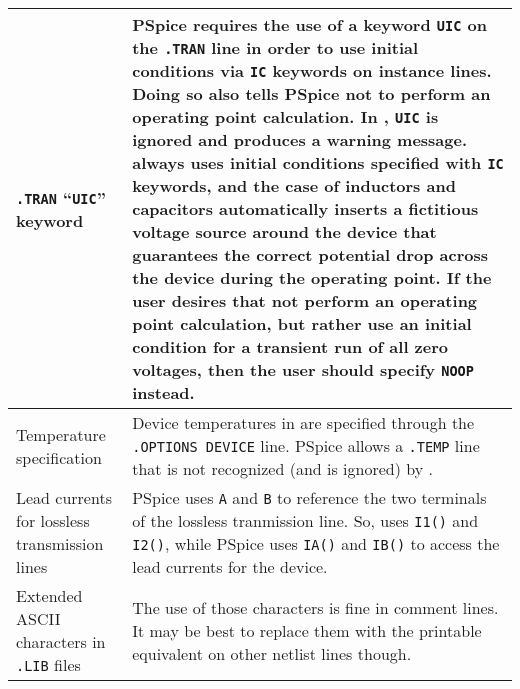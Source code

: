 \begin{longtable}[h] {>{\raggedright\small}m{2in}|>{\raggedright\let\\\tabularnewline\small}m{4in}}
\texttt{.TRAN} ``\texttt{UIC}'' keyword & PSpice requires the use
of a keyword \texttt{UIC} on the \texttt{.TRAN} line in order to use
initial conditions via \texttt{IC} keywords on instance lines.  Doing so 
also tells PSpice not to perform an operating point calculation. In
\Xyce{}, \texttt{UIC} is ignored and produces a warning message.  \Xyce{} 
always uses initial conditions specified with
\texttt{IC} keywords, and the case of inductors and capacitors automatically 
inserts a fictitious voltage source around the device that guarantees 
the correct potential drop across the device during the operating point.  
If the user desires that \Xyce{} not perform an operating point calculation, 
but rather use an initial condition for a transient run of all zero 
voltages, then the user should specify \texttt{NOOP} instead. \\ \hline

Temperature specification & Device temperatures in \Xyce{} are 
specified through the \texttt{.OPTIONS DEVICE} line.  PSpice 
allows a \texttt{.TEMP} line that is not recognized (and is ignored) 
by \Xyce{}. \\ \hline

Lead currents for lossless transmission lines & PSpice uses \texttt{A} and
\texttt{B} to reference the two terminals of the lossless tranmission line.  
So, \Xyce{} uses \texttt{I1()} and \texttt{I2()}, while PSpice uses \texttt{IA()} 
and \texttt{IB()} to access the lead currents for the device. \\ \hline

Extended ASCII characters in \texttt{.LIB} files & The use of those characters 
is fine in \Xyce{} comment lines.  It may be best to replace them with the 
printable equivalent on other \Xyce{} netlist lines though. 
\end{longtable}



